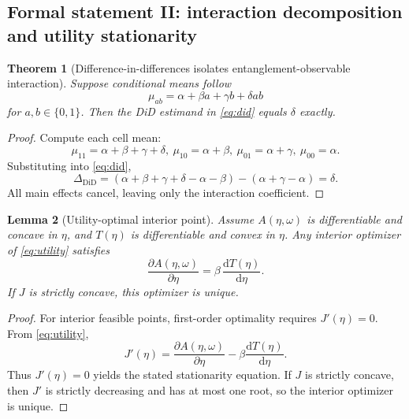 \documentclass{article} %
\newtheorem{theorem}{Theorem}[section]
\newtheorem{lemma}[theorem]{Lemma}
\begin{document}
\subsection{Formal statement II: interaction decomposition and utility stationarity}
\begin{theorem}[Difference-in-differences isolates entanglement-observable interaction]\label{thm:did}
Suppose conditional means follow
\[
\mu_{ab}=\alpha+\beta a+\gamma b+\delta ab
\]
for $a,b\in\{0,1\}$. Then the DiD estimand in \eqref{eq:did} equals $\delta$ exactly.
\end{theorem}
\begin{proof}
Compute each cell mean:
\[
\mu_{11}=\alpha+\beta+\gamma+\delta,\ \mu_{10}=\alpha+\beta,\ \mu_{01}=\alpha+\gamma,\ \mu_{00}=\alpha.
\]
Substituting into \eqref{eq:did},
\[
\Delta_{\mathrm{DiD}}=(\alpha+\beta+\gamma+\delta-\alpha-\beta)-(\alpha+\gamma-\alpha)=\delta.
\]
All main effects cancel, leaving only the interaction coefficient.\qedhere
\end{proof}

\begin{lemma}[Utility-optimal interior point]\label{lem:utility}
Assume $A(\eta,\omega)$ is differentiable and concave in $\eta$, and $T(\eta)$ is differentiable and convex in $\eta$. Any interior optimizer of \eqref{eq:utility} satisfies
\[
\frac{\partial A(\eta,\omega)}{\partial\eta}=\beta\,\frac{\mathrm{d}T(\eta)}{\mathrm{d}\eta}.
\]
If $J$ is strictly concave, this optimizer is unique.
\end{lemma}
\begin{proof}
For interior feasible points, first-order optimality requires $J'(\eta)=0$. From \eqref{eq:utility},
\[
J'(\eta)=\frac{\partial A(\eta,\omega)}{\partial\eta}-\beta\frac{\mathrm{d}T(\eta)}{\mathrm{d}\eta}.
\]
Thus $J'(\eta)=0$ yields the stated stationarity equation. If $J$ is strictly concave, then $J'$ is strictly decreasing and has at most one root, so the interior optimizer is unique.\qedhere
\end{proof}
\end{document}

